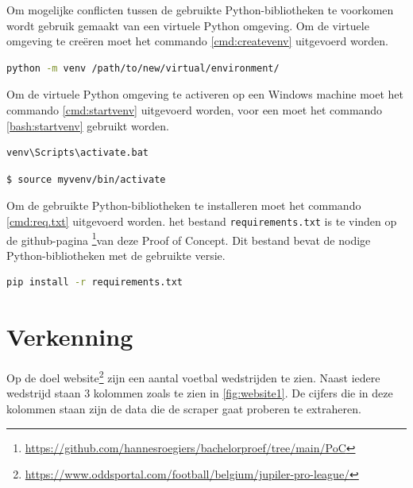 Om mogelijke conflicten tussen de gebruikte Python-bibliotheken te voorkomen wordt gebruik gemaakt van een virtuele Python omgeving. Om de virtuele omgeving te creëren moet het commando \ref{cmd:createvenv} uitgevoerd worden.

\begin{lstlisting}[language=bash, label={cmd:createvenv}, caption={Het commando om een virtuele Python omgeving te creëren}]
    python -m venv /path/to/new/virtual/environment/
\end{lstlisting}
Om de virtuele Python omgeving te activeren op een Windows machine moet het commando \ref{cmd:startvenv} uitgevoerd worden, voor een moet het commando \ref{bash:startvenv} gebruikt worden.
\begin{lstlisting}[language=bash, label={cmd:startvenv}, caption={Het commando om een virtuele Python omgeving te activeren op een Windows machine}]
    venv\Scripts\activate.bat
\end{lstlisting}

\begin{lstlisting}[language=bash, label={bash:startvenv}, caption={Het commando om een virtuele Python omgeving te activeren op een Linux of MacOS machine}]
    $ source myvenv/bin/activate
\end{lstlisting}

Om de gebruikte Python-bibliotheken te installeren moet het commando \ref{cmd:req.txt} uitgevoerd worden. het bestand \texttt{requirements.txt} is te vinden op de github-pagina \footnote{\url{https://github.com/hannesroegiers/bachelorproef/tree/main/PoC}}van deze Proof of Concept. Dit bestand bevat de nodige Python-bibliotheken met de gebruikte versie.
\begin{lstlisting}[language=bash, label={cmd:req.txt}, caption={Het commando om de nodige Python-bibliotheken te installeren}]
    pip install -r requirements.txt
\end{lstlisting}

\section{Verkenning}
Op de doel website\footnote{\url{https://www.oddsportal.com/football/belgium/jupiler-pro-league/}} zijn een aantal voetbal wedstrijden te zien. Naast iedere wedstrijd staan 3 kolommen zoals te zien in \ref{fig:website1}. De cijfers die in deze kolommen staan zijn de data die de scraper gaat proberen te extraheren.


